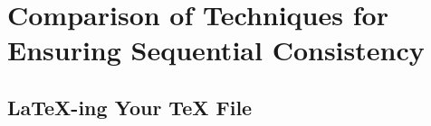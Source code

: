 \section{Comparison of Techniques for Ensuring Sequential Consistency}
\label{sec:figs}

\subsection{LaTeX-ing Your TeX File}



